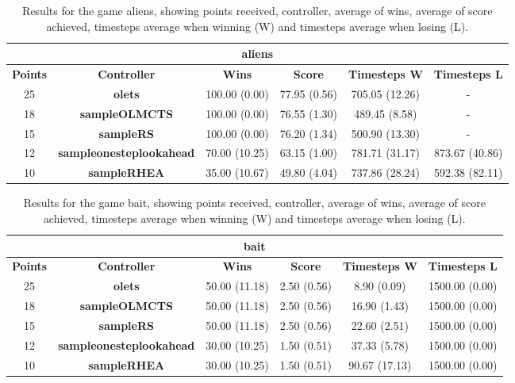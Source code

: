 \begin{table*}[!t]
\begin{center}
\begin{tabular}{|c|c|c|c|c|c|}
\multicolumn{6}{c}{\textbf{aliens}}\\
\hline
\textbf{Points} & \textbf{Controller} & \textbf{Wins} &  \textbf{Score} & \textbf{Timesteps W} & \textbf{Timesteps L}\\
\hline
25 & \textbf{olets} & 100.00 (0.00) & 77.95 (0.56) & 705.05 (12.26) &  - 
 \\
\hline
18 & \textbf{sampleOLMCTS} & 100.00 (0.00) & 76.55 (1.30) & 489.45 (8.58) &  - 
 \\
\hline
15 & \textbf{sampleRS} & 100.00 (0.00) & 76.20 (1.34) & 500.90 (13.30) &  - 
 \\
\hline
12 & \textbf{sampleonesteplookahead} & 70.00 (10.25) & 63.15 (1.00) & 781.71 (31.17) & 873.67 (40.86)
 \\
\hline
10 & \textbf{sampleRHEA} & 35.00 (10.67) & 49.80 (4.04) & 737.86 (28.24) & 592.38 (82.11)
 \\
\hline
\end{tabular}
\caption{Results for the game aliens, showing points received, controller, average of wins, average of score achieved, timesteps average when winning (W) and timesteps average when losing (L).}
\label{tab:weights}
\end{center}
\end{table*}
\begin{table*}[!t]
\begin{center}
\begin{tabular}{|c|c|c|c|c|c|}
\multicolumn{6}{c}{\textbf{bait}}\\
\hline
\textbf{Points} & \textbf{Controller} & \textbf{Wins} &  \textbf{Score} & \textbf{Timesteps W} & \textbf{Timesteps L}\\
\hline
25 & \textbf{olets} & 50.00 (11.18) & 2.50 (0.56) & 8.90 (0.09) & 1500.00 (0.00)
 \\
\hline
18 & \textbf{sampleOLMCTS} & 50.00 (11.18) & 2.50 (0.56) & 16.90 (1.43) & 1500.00 (0.00)
 \\
\hline
15 & \textbf{sampleRS} & 50.00 (11.18) & 2.50 (0.56) & 22.60 (2.51) & 1500.00 (0.00)
 \\
\hline
12 & \textbf{sampleonesteplookahead} & 30.00 (10.25) & 1.50 (0.51) & 37.33 (5.78) & 1500.00 (0.00)
 \\
\hline
10 & \textbf{sampleRHEA} & 30.00 (10.25) & 1.50 (0.51) & 90.67 (17.13) & 1500.00 (0.00)
 \\
\hline
\end{tabular}
\caption{Results for the game bait, showing points received, controller, average of wins, average of score achieved, timesteps average when winning (W) and timesteps average when losing (L).}
\label{tab:weights}
\end{center}
\end{table*}
